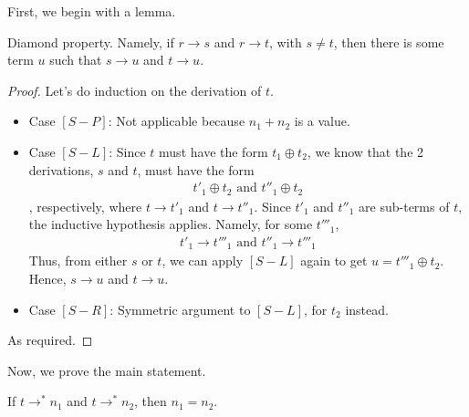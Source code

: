 \documentclass[12pt]{article}
\begin{document}
First, we begin with a lemma.
\begin{lemma}
\label{lemma:diamond}
Diamond property.
Namely, if $r \rightarrow s$ and $r \rightarrow t$, with $s \neq t$, then there is some term $u$ such that $s \rightarrow u$ and $t \rightarrow u$.
\end{lemma}
\begin{proof}
Let's do induction on the derivation of $t$.
\begin{itemize}
\item
Case $[S-P]$:
Not applicable because $n_1 + n_2$ is a value.
\item
Case $[S-L]$:
Since $t$ must have the form $t_1 \oplus t_2$,
we know that the 2 derivations, $s$ and $t$, must have the form
\begin{align}
t'_1 \oplus t_2 \text{ and } t''_1 \oplus t_2
\end{align}
, respectively, where $t \rightarrow t'_1$ and $t \rightarrow t''_1$.
Since $t'_1$ and $t''_1$ are sub-terms of $t$, the inductive hypothesis applies.
Namely, for some $t'''_1$,
\begin{align}
t'_1 \rightarrow t'''_1 \text{ and } t''_1 \rightarrow t'''_1
\end{align}
Thus, from either $s$ or $t$, we can apply $[S-L]$ again to get $u = t'''_1 \oplus t_2$.
Hence, $s \rightarrow u$ and $t \rightarrow u$.
\item
Case $[S-R]$:
Symmetric argument to $[S-L]$, for $t_2$ instead.
\end{itemize}
As required.
\end{proof}
Now, we prove the main statement.
\begin{claim}
If $t \rightarrow^* n_1$ and $t \rightarrow^* n_2$, then $n_1 = n_2$.
\end{claim}
\end{document}
